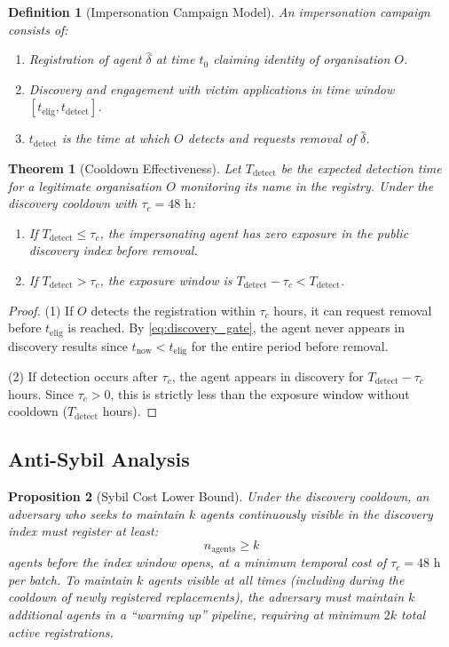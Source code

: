 \documentclass[conference]{IEEEtran}
\newtheorem{theorem}{Theorem}
\newtheorem{proposition}[theorem]{Proposition}
\newtheorem{definition}{Definition}
\begin{document}
\begin{definition}[Impersonation Campaign Model]
An impersonation campaign consists of:
\begin{enumerate}
  \item Registration of agent $\hat{\delta}$ at time $t_0$
    claiming identity of organisation $O$.
  \item Discovery and engagement with victim applications
    in time window $[t_{\text{elig}}, t_{\text{detect}}]$.
  \item $t_{\text{detect}}$ is the time at which $O$
    detects and requests removal of $\hat{\delta}$.
\end{enumerate}
\end{definition}

\begin{theorem}[Cooldown Effectiveness]
\label{thm:cooldown}
Let $T_{\text{detect}}$ be the expected detection time for
a legitimate organisation $O$ monitoring its name in the
registry.  Under the discovery cooldown with $\tau_c =
48\text{ h}$:
\begin{enumerate}
  \item If $T_{\text{detect}} \leq \tau_c$, the
    impersonating agent has zero exposure in the public
    discovery index before removal.
  \item If $T_{\text{detect}} > \tau_c$, the exposure
    window is $T_{\text{detect}} - \tau_c < T_{\text{detect}}$.
\end{enumerate}
\end{theorem}
\begin{proof}
(1) If $O$ detects the registration within $\tau_c$ hours,
it can request removal before $t_{\text{elig}}$ is reached.
By \eqref{eq:discovery_gate}, the agent never appears in
discovery results since $t_{\text{now}} < t_{\text{elig}}$
for the entire period before removal.

(2) If detection occurs after $\tau_c$, the agent appears
in discovery for $T_{\text{detect}} - \tau_c$ hours. Since
$\tau_c > 0$, this is strictly less than the exposure window
without cooldown ($T_{\text{detect}}$ hours).
\end{proof}

\subsection{Anti-Sybil Analysis}

\begin{proposition}[Sybil Cost Lower Bound]
\label{prop:sybil}
Under the discovery cooldown, an adversary who seeks to
maintain $k$ agents continuously visible in the discovery
index must register at least:
\begin{equation}
  n_{\text{agents}} \geq k
\end{equation}
agents before the index window opens, at a minimum temporal
cost of $\tau_c = 48\text{ h}$ per batch.  To maintain $k$
agents visible at all times (including during the cooldown
of newly registered replacements), the adversary must
maintain $k$ additional agents in a ``warming up'' pipeline,
requiring at minimum $2k$ total active registrations.
\end{proposition}
\end{document}
